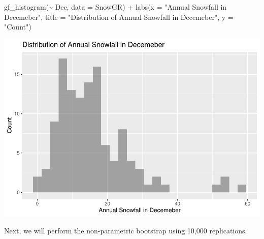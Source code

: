 \documentclass[12pt]{article}
\newenvironment{Shaded}{\begin{snugshade}}{\end{snugshade}}
\newcommand{\AttributeTok}[1]{\textcolor[rgb]{0.77,0.63,0.00}{#1}}
\newcommand{\FunctionTok}[1]{\textcolor[rgb]{0.00,0.00,0.00}{#1}}
\newcommand{\NormalTok}[1]{#1}
\newcommand{\SpecialCharTok}[1]{\textcolor[rgb]{0.00,0.00,0.00}{#1}}
\newcommand{\StringTok}[1]{\textcolor[rgb]{0.31,0.60,0.02}{#1}}
\begin{document}
\begin{Shaded}
\begin{Highlighting}[]
\FunctionTok{gf\_histogram}\NormalTok{(}\SpecialCharTok{\textasciitilde{}}\NormalTok{ Dec, }\AttributeTok{data =}\NormalTok{ SnowGR) }\SpecialCharTok{+}
  \FunctionTok{labs}\NormalTok{(}\AttributeTok{x =} \StringTok{"Annual Snowfall in Decemeber"}\NormalTok{, }
       \AttributeTok{title =} \StringTok{"Distribution of Annual Snowfall in Decemeber"}\NormalTok{, }\AttributeTok{y =} \StringTok{"Count"}\NormalTok{)}
\end{Highlighting}
\end{Shaded}

\includegraphics{paper_files/figure-latex/unnamed-chunk-1-1.pdf}

Next, we will perform the non-parametric bootstrap using 10,000
replications.
\end{document}
